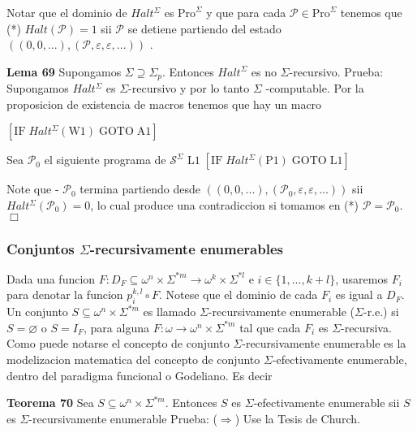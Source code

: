 Notar que el dominio de \(Halt^{\Sigma }\) es \(\mathrm{Pro}^{\Sigma }\) y que para cada \(\mathcal{P}\in \mathrm{Pro}^{\Sigma }\) tenemos que
(*) \(Halt(\mathcal{P})=1\) sii \(\mathcal{P}\) se detiene partiendo del estado \(\left( (0,0,...),(\mathcal{P},\varepsilon ,\varepsilon ,...)\right) \) .




\textbf{Lema 69} Supongamos \(\Sigma \supseteq \Sigma _{p}\). Entonces \( Halt^{\Sigma }\) es no \(\Sigma \)-recursivo.
Prueba: Supongamos \(Halt^{\Sigma }\) es \(\Sigma \)-recursivo y por lo tanto \(\Sigma \) -computable. Por la proposicion de existencia de macros tenemos que hay un macro

\(\displaystyle \left[ \mathrm{IF}\;Halt^{\Sigma }(\mathrm{W}1)\;\mathrm{GOTO}\;\mathrm{A}1 \right] \)

Sea \(\mathcal{P}_{0}\) el siguiente programa de \(\mathcal{S}^{\Sigma }\)
\(\displaystyle \mathrm{L}1\;\left[ \mathrm{IF}\;Halt^{\Sigma }(\mathrm{P}1)\;\mathrm{GOTO}\; \mathrm{L}1\right] \)

Note que
- \(\mathcal{P}_{0}\) termina partiendo desde \(\left( (0,0,...),( \mathcal{P}_{0},\varepsilon ,\varepsilon ,...)\right) \) sii \(Halt^{\Sigma }( \mathcal{P}_{0})=0\),
lo cual produce una contradiccion si tomamos en (*) \(\mathcal{P}= \mathcal{P}_{0}\). \(\Box\)

\subsubsection{Conjuntos \(\Sigma \)-recursivamente enumerables}

Dada una funcion \(F:D_{F}\subseteq \omega ^{n}\times \Sigma ^{\ast m}\rightarrow \omega ^{k}\times \Sigma ^{\ast l}\) e \(i\in \{1,...,k+l\}\), usaremos \(F_{i}\) para denotar la funcion \(p_{i}^{k,l}\circ F\). Notese que el dominio de cada \(F_{i}\) es igual a \(D_{F}\). Un conjunto \(S\subseteq \omega ^{n}\times \Sigma ^{\ast m}\) es llamado \(\Sigma \)-recursivamente enumerable (\(\Sigma \)-r.e.) si \(S=\varnothing \) o \(S=I_{F}\), para alguna \(F:\omega \rightarrow \omega ^{n}\times \Sigma ^{\ast m}\) tal que cada \(F_{i}\) es \(\Sigma \)-recursiva. Como puede notarse el concepto de conjunto \(\Sigma \)-recursivamente enumerable es la modelizacion matematica del concepto de conjunto \(\Sigma \)-efectivamente enumerable, dentro del paradigma funcional o Godeliano. Es decir




\textbf{Teorema 70} Sea \(S\subseteq \omega ^{n}\times \Sigma ^{\ast m}\). Entonces \(S\) es \(\Sigma \)-efectivamente enumerable sii \(S\) es \(\Sigma \)-recursivamente enumerable
Prueba: (\(\Rightarrow \)) Use la Tesis de Church.

